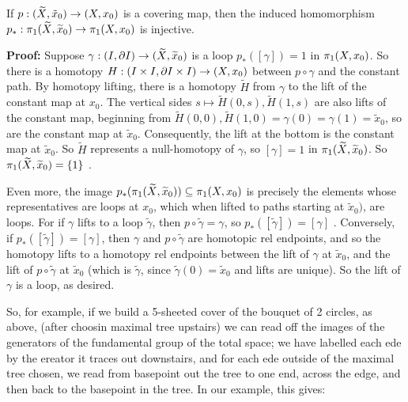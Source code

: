 \bsk  


If $p:(\widetilde{X},\tilde{x}_0)\rightarrow (X,x_0)$ is a covering map, then the 
induced homomorphism $p_*:\pi_1(\widetilde{X},\widetilde{x}_0)\rightarrow \pi_1(X,x_0)$ is
injective.

\msk

{\bf Proof:} Suppose $\gamma:(I,\partial I)\rightarrow (\widetilde{X},\widetilde{x}_0)$ is a 
loop $p_*([\gamma])=1$ in $\pi_1(X,x_0)$. So there is a homotopy
$H:(I\times I,\partial I\times I)\rightarrow (X,x_0)$ between $p\circ\gamma$ and the constant 
path. By homotopy lifting, there is a homotopy $\widetilde{H}$ from $\gamma$ to 
the lift of the constant map at $x_0$. The vertical sides 
$s\mapsto \widetilde{H}(0,s),\widetilde{H}(1,s)$ are also lifts of the 
constant map, beginning from 
$\widetilde{H}(0,0),\widetilde{H}(1,0)=\gamma(0)=\gamma(1)=\widetilde{x}_0$, so
are the constant map at $\widetilde{x}_0$. Consequently, the lift at the 
bottom is the constant map at $\widetilde{x}_0$. So $\widetilde{H}$
represents a null-homotopy of $\gamma$, so $[\gamma]=1$
in $\pi_1(\widetilde{X},\widetilde{x}_0)$. So $\pi_1(\widetilde{X},\widetilde{x}_0)=\{1\}$ .

\msk

Even more, the image $p_*(\pi_1(\widetilde{X},\widetilde{x}_0))\subseteq \pi_1(X,x_0)$
is precisely the elements whose representatives are loops at $x_0$, 
which when
lifted to paths starting at $\widetilde{x}_0)$, are loops. 
For if $\gamma$ lifts
to a loop $\widetilde{\gamma}$, then $p\circ\widetilde{\gamma}=\gamma$, so
$p_*([\widetilde{\gamma}])=[\gamma]$ . Conversely, if 
$p_*([\widetilde{\gamma}])=[\gamma]$, then $\gamma$ and $p\circ\widetilde{\gamma}$
are homotopic rel endpoints, and so the homotopy lifts to 
a homotopy rel endpoints between the lift of $\gamma$ at 
$\widetilde{x}_0$, and the lift of $p\circ\widetilde{\gamma}$ at $\widetilde{x}_0$
(which is $\widetilde{\gamma}$, since $\widetilde{\gamma}(0)=\widetilde{x}_0$ and
lifts are unique). So the lift of $\gamma$ is a loop, as desired.

\msk

So, for example, if we build a 5-sheeted cover of the bouquet of 2 circles, 
as above, (after choosin maximal tree upstairs) 
we can read off the images of the generators of the fundamental group
of the total space; we have labelled each ede by the ereator it
traces out downstairs, and for each ede outside of the maximal tree
chosen, we read from basepoint out the tree to one end, across the edge,
and then back to the basepoint in the tree. In our example, this
gives:


